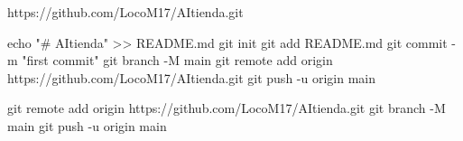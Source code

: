 https://github.com/LocoM17/AItienda.git



echo "# AItienda" >> README.md
git init
git add README.md
git commit -m "first commit"
git branch -M main
git remote add origin https://github.com/LocoM17/AItienda.git
git push -u origin main



git remote add origin https://github.com/LocoM17/AItienda.git
git branch -M main
git push -u origin main